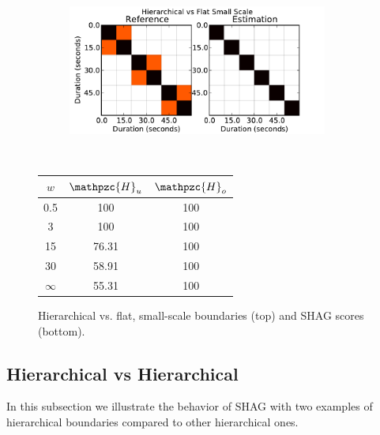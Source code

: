 \documentclass{article}
\def\shag{\ensuremath{\mathpzc{H}}}
\begin{document}
\begin{figure}[t]
  \centering
  \begin{subfigure}{0.5\textwidth}
    \centering
    \includegraphics[width=0.94\textwidth]{plots/hier-flatsmall.pdf}
  \end{subfigure}%
  \\
  \begin{minipage}{0.5\textwidth}
    \centering
    \vspace{10pt}
    \begin{tabular}{|c|c|c|}
      \hline
      $w$       & $\shag_u$    & $\shag_o$      \\
      \hline
      0.5       & 100       & 100      \\     
      3         & 100       & 100      \\
      15        & 76.31     & 100    \\
      30        & 58.91     & 100    \\
      $\infty$  & 55.31     & 100    \\
      \hline
    \end{tabular}
  \end{minipage}
  \caption{Hierarchical vs. flat, small-scale boundaries (top) and SHAG scores
  (bottom).}
  \label{fig:hier-flatsmall}
\end{figure}

\subsection{Hierarchical vs Hierarchical}

In this subsection we illustrate the behavior of SHAG with two examples of hierarchical boundaries compared to other hierarchical ones.

\end{document}
